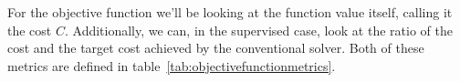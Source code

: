 For the objective function we'll be looking at the function value itself, calling it the cost $C$.
Additionally, we can, in the supervised case, look at the ratio of the
cost and the target cost achieved by the conventional solver.
Both of these metrics are defined in table~\ref{tab:objectivefunctionmetrics}.